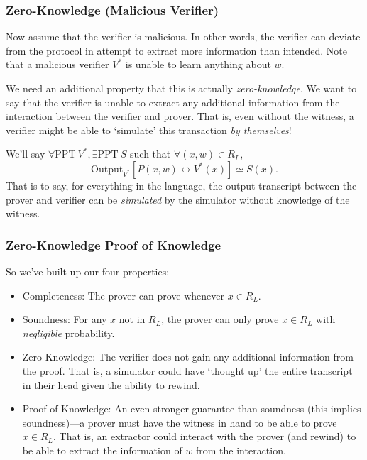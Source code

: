 \subsubsection{Zero-Knowledge (Malicious Verifier)}

Now assume that the verifier is malicious. In other words, the verifier can deviate from the protocol in attempt to extract more information than intended. Note that a malicious verifier $V^*$ is unable to learn anything about $w$.

We need an additional property that this is actually \emph{zero-knowledge}. We want to say that the verifier is unable to extract any additional information from the interaction between the verifier and prover. That is, even without the witness, a verifier might be able to `simulate' this transaction \emph{by themselves}!

    We'll say $\forall \mathrm{PPT}\ V^*, \exists \mathrm{PPT}\ S$ such that $\forall (x, w)\in R_L$,
    \[\mathrm{Output}_{V^*}[P(x, w)\leftrightarrow V^*(x)]\simeq S(x).\]
    That is to say, for everything in the language, the output transcript between the prover and verifier can be \emph{simulated} by the simulator without knowledge of the witness.

\subsubsection{Zero-Knowledge Proof of Knowledge}

So we've built up our four properties:
\begin{itemize}
    \item Completeness: The prover can prove whenever $x\in R_L$.
    \item Soundness: For any $x$ not in $R_L$, the prover can only prove $x\in R_L$ with \emph{negligible} probability.
    \item Zero Knowledge: The verifier does not gain any additional information from the proof. That is, a simulator could have `thought up' the entire transcript in their head given the ability to rewind.
    \item Proof of Knowledge: An even stronger guarantee than soundness (this implies soundness)---a prover must have the witness in hand to be able to prove $x\in R_L$. That is, an extractor could interact with the prover (and rewind) to be able to extract the information of $w$ from the interaction.
\end{itemize}

